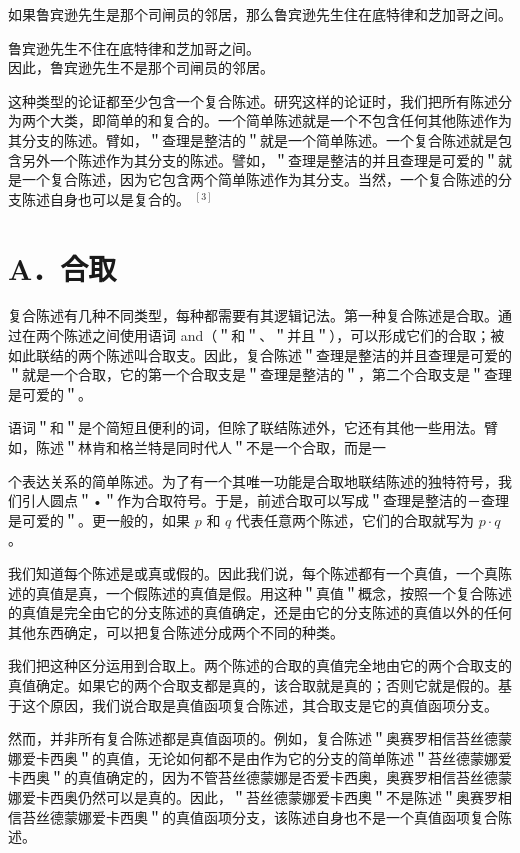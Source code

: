 如果鲁宾逊先生是那个司闸员的邻居，那么鲁宾逊先生住在底特律和芝加哥之间。

鲁宾逊先生不住在底特律和芝加哥之间。\\
因此，鲁宾逊先生不是那个司闸员的邻居。

这种类型的论证都至少包含一个复合陈述。研究这样的论证时，我们把所有陈述分为两个大类，即简单的和复合的。一个简单陈述就是一个不包含任何其他陈述作为其分支的陈述。臂如，＂查理是整洁的＂就是一个简单陈述。一个复合陈述就是包含另外一个陈述作为其分支的陈述。譬如，＂查理是整洁的并且查理是可爱的＂就是一个复合陈述，因为它包含两个简单陈述作为其分支。当然，一个复合陈述的分支陈述自身也可以是复合的。 ${ }^{[3]}$

\section*{A．合取}
复合陈述有几种不同类型，每种都需要有其逻辑记法。第一种复合陈述是合取。通过在两个陈述之间使用语词 and（＂和＂、＂并且＂），可以形成它们的合取；被如此联结的两个陈述叫合取支。因此，复合陈述＂查理是整洁的并且查理是可爱的＂就是一个合取，它的第一个合取支是＂查理是整洁的＂，第二个合取支是＂查理是可爱的＂。

语词＂和＂是个简短且便利的词，但除了联结陈述外，它还有其他一些用法。臂如，陈述＂林肯和格兰特是同时代人＂不是一个合取，而是一

个表达关系的简单陈述。为了有一个其唯一功能是合取地联结陈述的独特符号，我们引人圆点＂•＂作为合取符号。于是，前述合取可以写成＂查理是整洁的－查理是可爱的＂。更一般的，如果 $p$ 和 $q$ 代表任意两个陈述，它们的合取就写为 $p \cdot q$ 。

我们知道每个陈述是或真或假的。因此我们说，每个陈述都有一个真值，一个真陈述的真值是真，一个假陈述的真值是假。用这种＂真值＂概念，按照一个复合陈述的真值是完全由它的分支陈述的真值确定，还是由它的分支陈述的真值以外的任何其他东西确定，可以把复合陈述分成两个不同的种类。

我们把这种区分运用到合取上。两个陈述的合取的真值完全地由它的两个合取支的真值确定。如果它的两个合取支都是真的，该合取就是真的；否则它就是假的。基于这个原因，我们说合取是真值函项复合陈述，其合取支是它的真值函项分支。

然而，并非所有复合陈述都是真值函项的。例如，复合陈述＂奥赛罗相信苔丝德蒙娜爱卡西奥＂的真值，无论如何都不是由作为它的分支的简单陈述＂苔丝德蒙娜爱卡西奥＂的真值确定的，因为不管苔丝德蒙娜是否爱卡西奥，奥赛罗相信苔丝德蒙娜爱卡西奥仍然可以是真的。因此，＂苔丝德蒙娜爱卡西奧＂不是陈述＂奥赛罗相信苔丝德蒙娜爱卡西奧＂的真值函项分支，该陈述自身也不是一个真值函项复合陈述。

